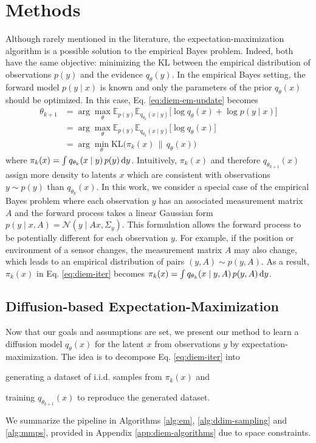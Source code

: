 \section{Methods} \label{sec:diem-methods}

Although rarely mentioned in the literature, the expectation-maximization algorithm is a possible solution to the empirical Bayes problem. Indeed, both have the same objective: minimizing the KL between the empirical distribution of observations $p(y)$ and the evidence $q_\theta(y)$. In the empirical Bayes setting, the forward model $p(y \mid x)$ is known and only the parameters of the prior $q_\theta(x)$ should be optimized. In this case, Eq. \eqref{eq:diem-em-update} becomes
\begin{align}
    \theta_{k+1} & = \arg\max_\theta \mathbb{E}_{p(y)} \mathbb{E}_{q_{\theta_k}(x \mid y)} \big[ \log q_\theta(x) + \log p(y \mid x) \big] \\
    & = \arg\max_\theta \mathbb{E}_{p(y)} \mathbb{E}_{q_{\theta_k}(x \mid y)} \big[ \log q_\theta(x) \big] \\
    & = \arg\min_\theta \mathrm{KL} \big( \pi_k(x) \, \| \, q_\theta(x) \big) \label{eq:diem-iter}
\end{align}
where $\pi_k(x) = \int q_{\theta_k}(x \mid y) \, p(y) \operatorname{d}\!{y}$. Intuitively, $\pi_k(x)$ and therefore $q_{\theta_{k+1}}(x)$ assign more density to latents $x$ which are consistent with observations $y \sim p(y)$ than $q_{\theta_k}(x)$. In this work, we consider a special case of the empirical Bayes problem where each observation $y$ has an associated measurement matrix $A$ and the forward process takes a linear Gaussian form $p(y \mid x, A) = \mathcal{N}(y \mid Ax, \Sigma_y)$. This formulation allows the forward process to be potentially different for each observation $y$. For example, if the position or environment of a sensor changes, the measurement matrix $A$ may also change, which leads to an empirical distribution of pairs $(y, A) \sim p(y, A)$. As a result, $\pi_k(x)$ in Eq. \eqref{eq:diem-iter} becomes $\pi_k(x) = \int q_{\theta_k}(x \mid y, A) \, p(y, A) \operatorname{d}\!{y}$.

\subsection{Diffusion-based Expectation-Maximization}

Now that our goals and assumptions are set, we present our method to learn a diffusion model $q_\theta(x)$ for the latent $x$ from observations $y$ by expectation-maximization. The idea is to decompose Eq. \eqref{eq:diem-iter} into
\begin{enumerate*}[label=(\roman*)]
    \item generating a dataset of i.i.d. samples from $\pi_k(x)$ and
    \item training $q_{\theta_{k+1}}(x)$ to reproduce the generated dataset.
\end{enumerate*}
We summarize the pipeline in Algorithms \ref{alg:em}, \ref{alg:ddim-sampling} and \ref{alg:mmps}, provided in Appendix \ref{app:diem-algorithms} due to space constraints.

